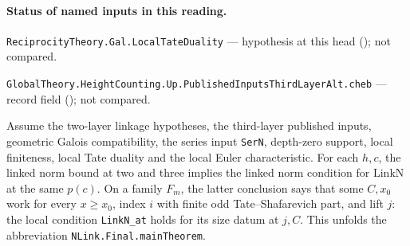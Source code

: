 

\paragraph{Status of named inputs in this reading.}
\noindent\nolinkurl{ReciprocityTheory.Gal.LocalTateDuality} --- hypothesis at this head (); not compared.\par
\noindent\nolinkurl{GlobalTheory.HeightCounting.Up.PublishedInputsThirdLayerAlt.cheb} --- record field (); not compared.\par

\begin{formalstatement}\label{sub:T07}

Assume the two-layer linkage hypotheses, the third-layer published inputs,
geometric Galois compatibility, the series input \nolinkurl{SerN},
depth-zero support, local finiteness, local Tate duality and the local Euler
characteristic. For each $h,c$, the linked norm bound at two and three
implies the linked norm condition for $\mathrm{LinkN}$ at the same $p(c)$.
On a family $F_m$, the latter conclusion says that some $C,x_0$ work for
every $x\ge x_0$, index $i$ with finite odd Tate--Shafarevich part, and lift
$j$: the local condition \nolinkurl{LinkN_at} holds for its size datum at
$j,C$. This unfolds the abbreviation \nolinkurl{NLink.Final.mainTheorem}.

\end{formalstatement}

